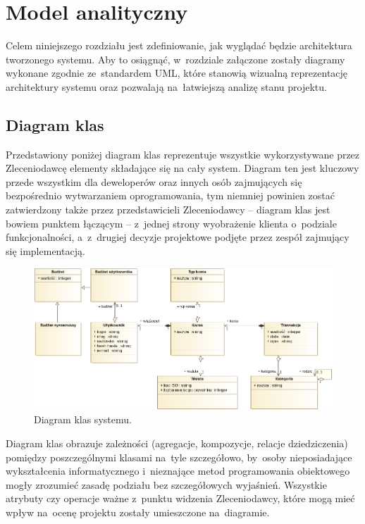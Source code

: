 \section{Model analityczny}
Celem niniejszego rozdziału jest zdefiniowanie, jak wyglądać będzie architektura tworzonego systemu. Aby to osiągnąć, w~rozdziale załączone zostały diagramy wykonane zgodnie ze~standardem UML, które stanowią wizualną reprezentację architektury systemu oraz pozwalają na~łatwiejszą analizę stanu projektu.

\subsection{Diagram klas}
Przedstawiony poniżej diagram klas reprezentuje wszystkie wykorzystywane przez Zleceniodawcę elementy składające się na cały system. Diagram ten jest kluczowy przede wszystkim dla deweloperów oraz innych osób zajmujących się bezpośrednio wytwarzaniem oprogramowania, tym niemniej powinien zostać zatwierdzony także przez przedstawicieli Zleceniodawcy -- diagram klas jest bowiem punktem łączącym -- z~jednej strony wyobrażenie klienta o~podziale funkcjonalności, a~z~drugiej decyzje projektowe podjęte przez zespół zajmujący się implementacją.\\

\begin{figure}[H]
  \centering
  \includegraphics[width=\textwidth]{images/class-diagram.png}
  \caption{Diagram klas systemu.}
\end{figure}

Diagram klas obrazuje zależności (agregacje, kompozycje, relacje dziedziczenia) pomiędzy poszczególnymi klasami na~tyle szczegółowo, by~osoby nieposiadające wykształcenia informatycznego i~nieznające metod programowania obiektowego mogły zrozumieć zasadę podziału bez szczegółowych wyjaśnień. Wszystkie atrybuty czy operacje ważne z~punktu widzenia Zleceniodawcy, które mogą mieć wpływ na~ocenę projektu zostały umieszczone na~diagramie.
